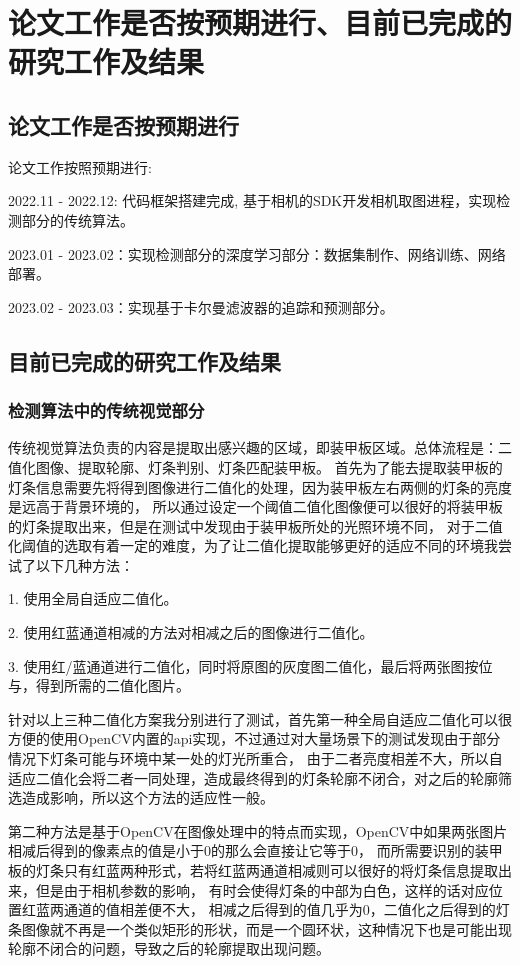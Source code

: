 \section{论文工作是否按预期进行、目前已完成的研究工作及结果}
\subsection{论文工作是否按预期进行}
论文工作按照预期进行: \par
2022.11 - 2022.12: 代码框架搭建完成, 基于相机的SDK开发相机取图进程，实现检测部分的传统算法。\par
2023.01 - 2023.02：实现检测部分的深度学习部分：数据集制作、网络训练、网络部署。\par
2023.02 - 2023.03：实现基于卡尔曼滤波器的追踪和预测部分。\par
\subsection{目前已完成的研究工作及结果}
\subsubsection{检测算法中的传统视觉部分}
传统视觉算法负责的内容是提取出感兴趣的区域，即装甲板区域。总体流程是：二值化图像、提取轮廓、灯条判别、灯条匹配装甲板。
首先为了能去提取装甲板的灯条信息需要先将得到图像进行二值化的处理，因为装甲板左右两侧的灯条的亮度是远高于背景环境的，
所以通过设定一个阈值二值化图像便可以很好的将装甲板的灯条提取出来，但是在测试中发现由于装甲板所处的光照环境不同，
对于二值化阈值的选取有着一定的难度，为了让二值化提取能够更好的适应不同的环境我尝试了以下几种方法：\par
1. 使用全局自适应二值化。\par
2. 使用红蓝通道相减的方法对相减之后的图像进行二值化。\par
3. 使用红/蓝通道进行二值化，同时将原图的灰度图二值化，最后将两张图按位与，得到所需的二值化图片。\par

针对以上三种二值化方案我分别进行了测试，首先第一种全局自适应二值化可以很方便的使用OpenCV内置的api实现，不过通过对大量场景下的测试发现由于部分情况下灯条可能与环境中某一处的灯光所重合，
由于二者亮度相差不大，所以自适应二值化会将二者一同处理，造成最终得到的灯条轮廓不闭合，对之后的轮廓筛选造成影响，所以这个方法的适应性一般。\par

第二种方法是基于OpenCV在图像处理中的特点而实现，OpenCV中如果两张图片相减后得到的像素点的值是小于0的那么会直接让它等于0，
而所需要识别的装甲板的灯条只有红蓝两种形式，若将红蓝两通道相减则可以很好的将灯条信息提取出来，但是由于相机参数的影响，
有时会使得灯条的中部为白色，这样的话对应位置红蓝两通道的值相差便不大，
相减之后得到的值几乎为0，二值化之后得到的灯条图像就不再是一个类似矩形的形状，而是一个圆环状，这种情况下也是可能出现轮廓不闭合的问题，导致之后的轮廓提取出现问题。\par

